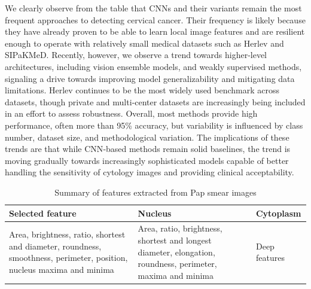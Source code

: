 \documentclass{svjour3}
\begin{document}
We clearly observe from the table that CNNs and their variants remain the most frequent approaches to detecting cervical cancer. Their frequency is likely because they have already proven to be able to learn local image features and are resilient enough to operate with relatively small medical datasets such as Herlev and SIPaKMeD. Recently, however, we observe a trend towards higher‑level architectures, including vision ensemble models, and weakly supervised methods, signaling a drive towards improving model generalizability and mitigating data limitations. Herlev continues to be the most widely used benchmark across datasets, though private and multi‑center datasets are increasingly being included in an effort to assess robustness. Overall, most methods provide high performance, often more than 95\% accuracy, but variability is influenced by class number, dataset size, and methodological variation. The implications of these trends are that while CNN‑based methods remain solid baselines, the trend is moving gradually towards increasingly sophisticated models capable of better handling the sensitivity of cytology images and providing clinical acceptability.
\begin{table}[htbp]
\centering
\caption{Summary of features extracted from Pap smear images}
\label{tab:features}
\begin{tabular}{lll}
\hline
Selected feature & Nucleus & Cytoplasm \\
\hline
Area, brightness, ratio, shortest and diameter, roundness, smoothness, perimeter, position, nucleus maxima and minima & Area, ratio, brightness, shortest and longest diameter, elongation, roundness, perimeter, maxima and minima & Deep features \\
\hline
\end{tabular}
\end{table}
\end{document}

